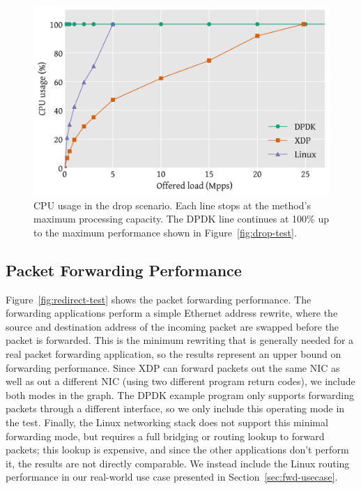 \documentclass[10pt,sigconf]{acmart}
\begin{document}
\begin{figure}[t]
\centering
\includegraphics[width=\linewidth]{figures/drop-cpu.pdf}
\caption{\label{fig:drop-cpu} CPU usage in the drop scenario. Each line stops at
  the method's maximum processing capacity. The DPDK line continues at 100\% up
  to the maximum performance shown in Figure~\ref{fig:drop-test}.}
\end{figure}


\subsection{Packet Forwarding Performance}
\label{sec:pack-forw-perf}
Figure~\ref{fig:redirect-test} shows the packet forwarding performance. The
forwarding applications perform a simple Ethernet address rewrite, where the
source and destination address of the incoming packet are swapped before the
packet is forwarded. This is the minimum rewriting that is generally needed for
a real packet forwarding application, so the results represent an upper bound on
forwarding performance. Since XDP can forward packets out the same NIC as well
as out a different NIC (using two different program return codes), we include
both modes in the graph. The DPDK example program only supports forwarding
packets through a different interface, so we only include this operating mode in
the test. Finally, the Linux networking stack does not support this minimal
forwarding mode, but requires a full bridging or routing lookup to forward
packets; this lookup is expensive, and since the other applications don't
perform it, the results are not directly comparable. We instead include the
Linux routing performance in our real-world use case presented in
Section~\ref{sec:fwd-usecase}.
\end{document}
